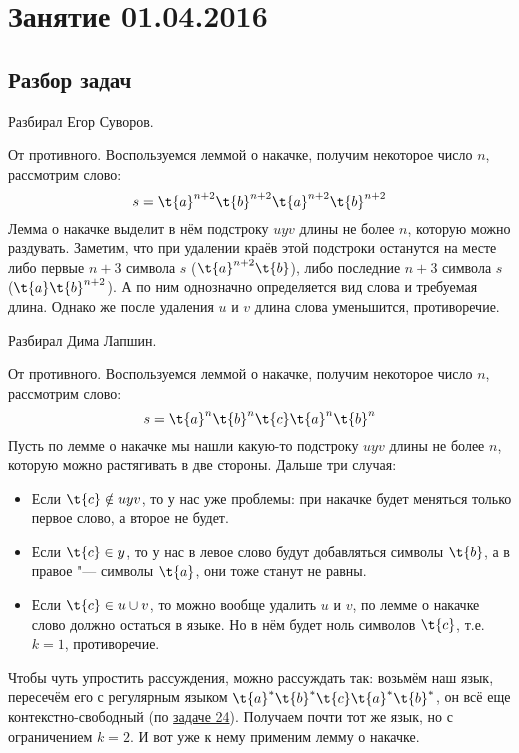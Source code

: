\chapter{Занятие 01.04.2016}
\section{Разбор задач}

	Разбирал Егор Суворов.

	От противного.
	Воспользуемся леммой о накачке, получим некоторое число $n$, рассмотрим слово:
	\[ s=\t{a}^{n+2}\t{b}^{n+2}\t{a}^{n+2}\t{b}^{n+2} \]
	Лемма о накачке выделит в нём подстроку $uyv$ длины не более $n$, которую можно раздувать.
	Заметим, что при удалении краёв этой подстроки останутся на месте либо первые $n+3$ символа $s$ ($\t{a}^{n+2}\t{b}$),
	либо последние $n+3$ символа $s$ ($\t{a}\t{b}^{n+2}$).
	А по ним однозначно определяется вид слова и требуемая длина.
	Однако же после удаления $u$ и $v$ длина слова уменьшится, противоречие.

	Разбирал Дима Лапшин.

	От противного.
	Воспользуемся леммой о накачке, получим некоторое число $n$, рассмотрим слово:
	\[ s = \t{a}^n\t{b}^n\t{c}\t{a}^n\t{b}^n \]
	Пусть по лемме о накачке мы нашли какую-то подстроку $uyv$ длины не более $n$,
	которую можно растягивать в две стороны.
	Дальше три случая:
	\begin{itemize}
		\item
			Если $\t{c} \notin uyv$, то у нас уже проблемы: при накачке будет меняться только первое слово, а второе не будет.
		\item
			Если $\t{c} \in y$, то у нас в левое слово будут добавляться символы $\t{b}$, а в правое "--- символы $\t{a}$, они тоже станут не равны.
		\item
			Если $\t{c} \in u \cup v$, то можно вообще удалить $u$ и $v$, по лемме о накачке слово должно остаться в языке.
			Но в нём будет ноль символов $\t{c}$, т.е. $k=1$, противоречие.
	\end{itemize}

	\begin{Rem}
		Чтобы чуть упростить рассуждения, можно рассуждать так:
		возьмём наш язык, пересечём его с регулярным языком $\t{a}^*\t{b}^*\t{c}\t{a}^*\t{b}^*$,
		он всё еще контекстно-свободный (по \hyperref[prob24]{задаче 24}).
		Получаем почти тот же язык, но с ограничением $k=2$.
		И вот уже к нему применим лемму о накачке.
	\end{Rem}


